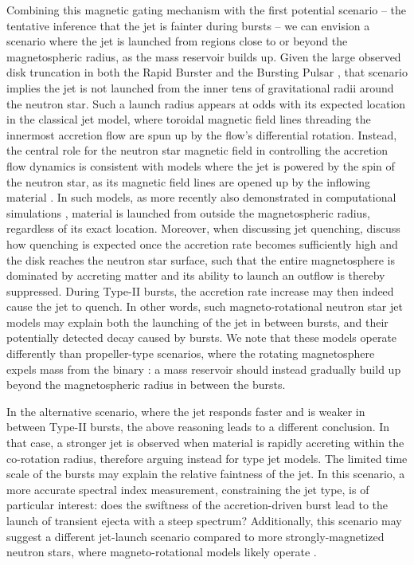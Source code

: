 \documentclass[fleqn,usenatbib]{mnras}
\begin{document}
Combining this magnetic gating mechanism with the first potential scenario -- the tentative inference that the jet is fainter during bursts -- we can envision a scenario where the jet is launched from regions close to or beyond the magnetospheric radius, as the mass reservoir builds up. Given the large observed disk truncation in both the Rapid Burster \citep[$41.8^{+6.7}_{-5.3}$ $R_g$;][]{vandeneijnden2017} and the Bursting Pulsar \citep[$85.0\pm10.9$ $R_g$;][]{degenaar2014}, that scenario implies the jet is not launched from the inner tens of gravitational radii around the neutron star. Such a launch radius appears at odds with its expected location in the classical \citet{blandford1982} jet model, where toroidal magnetic field lines threading the innermost accretion flow are spun up by the flow's differential rotation. Instead, the central role for the neutron star magnetic field in controlling the accretion flow dynamics is consistent with models where the jet is powered by the spin of the neutron star, as its magnetic field lines are opened up by the inflowing material \citet{parfrey2016}. In such models, as more recently also demonstrated in computational simulations \citep{parfrey2023,das2022,das2024,berthier2024}, material is launched from outside the magnetospheric radius, regardless of its exact location. Moreover, when discussing jet quenching, \citet{parfrey2016} discuss how quenching is expected once the accretion rate becomes sufficiently high and the disk reaches the neutron star surface, such that the entire magnetosphere is dominated by accreting matter and its ability to launch an outflow is thereby suppressed. During Type-II bursts, the accretion rate increase may then indeed cause the jet to quench. In other words, such magneto-rotational neutron star jet models may explain both the launching of the jet in between bursts, and their potentially detected decay caused by bursts. We note that these models operate differently than propeller-type scenarios, where the rotating magnetosphere expels mass from the binary \citep{illarionov1975}: a mass reservoir should instead gradually build up beyond the magnetospheric radius in between the bursts.

In the alternative scenario, where the jet responds faster and is weaker in between Type-II bursts, the above reasoning leads to a different conclusion. In that case, a stronger jet is observed when material is rapidly accreting within the co-rotation radius, therefore arguing instead for \citep{blandford1982} type jet models. The limited time scale of the bursts may explain the relative faintness of the jet. In this scenario, a more accurate spectral index measurement, constraining the jet type, is of particular interest: does the swiftness of the accretion-driven burst lead to the launch of transient ejecta with a steep spectrum? Additionally, this scenario may suggest a different jet-launch scenario compared to more strongly-magnetized neutron stars, where magneto-rotational models likely operate \citep{vandeneijnden2021}.
\end{document}
